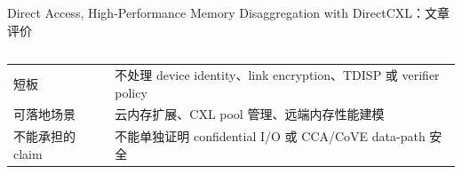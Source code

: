 \begin{frame}[t,shrink=6]{Direct Access, High-Performance Memory Disaggregation with DirectCXL：文章评价}
\begin{columns}[T,totalwidth=\textwidth]
\begin{column}{0.49\textwidth}
{\begin{minipage}[t]{0.97\linewidth}
\begin{minipage}{0.92\linewidth}
{\begin{tabularx}{\linewidth}{@{}YY@{}}
短板 & 不处理 device identity、link encryption、TDISP 或 verifier policy \\
可落地场景 & 云内存扩展、CXL pool 管理、远端内存性能建模 \\
不能承担的 claim & 不能单独证明 confidential I/O 或 CCA/CoVE data-path 安全 \\
\bottomrule
\end{tabularx}
}
    \end{minipage}
    \vspace{1mm}
  \end{minipage}}
  \end{column}
\end{columns}
\end{frame}


